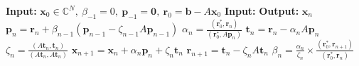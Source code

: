 \begin{algorithm}[H]\caption{}\label{alg:bicgstab}\begin{algorithmic}[1]
\Statex\textbf{Input:} $\bm x_0\in\mathbb C^N,\ \beta_{-1}=0,\ \bm p_{-1}=\bm0,\ \bm r_0=\bm b-A\bm x_0$
\Statex\textbf{Input:} 
\Statex\textbf{Output:} $\bm x_n$
\State $\bm p_n=\bm r_n+\beta_{n-1}(\bm p_{n-1}-\zeta_{n-1}A\bm p_{n-1})$
\State $\alpha_n=\frac{(\bm r_0^{*},\bm r_n)}{(\bm r_0^{*},A\bm p_n)}$
\State $\bm t_n=\bm r_n-\alpha_nA\bm p_n$
\State $\zeta_n=\frac{(A\bm t_n,\bm t_n)}{(A\bm t_n,A\bm t_n)}$
\State $\bm x_{n+1}=\bm x_n+\alpha_n\bm p_n+\zeta_n\bm t_n$
\State $\bm r_{n+1}=\bm t_n-\zeta_nA\bm t_n$
\State $\beta_n=\frac{\alpha_n}{\zeta_n}\times\frac{(\bm r_0^{*},\bm r_{n+1})}{(\bm r_0^{*},\bm r_n)}$
\EndFor\end{algorithmic}\end{algorithm}

